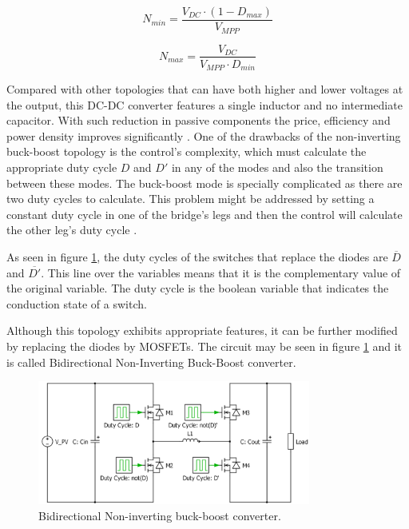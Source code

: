 \begin{equation} \label{boost_number_of_panels}
 N_{min} = \frac{V_{DC} \cdot (1 - D_{max})}{V_{MPP}}
\end{equation}

\begin{equation} \label{buck_number_of_panels}
 N_{max} = \frac{V_{DC}}{V_{MPP} \cdot D_{min}}
\end{equation}

Compared with other topologies that can have both higher and lower voltages at the output, this DC-DC converter features a single inductor and no intermediate capacitor. With such reduction in passive components the price, efficiency and power density improves significantly \cite{underthehood}. One of the drawbacks of the non-inverting buck-boost topology is the control's complexity, which must calculate the appropriate duty cycle $D$ and $D'$ in any of the modes and also the transition between these modes. The buck-boost mode is specially complicated as there are two duty cycles to calculate. This problem might be addressed by setting a constant duty cycle in one of the bridge's legs and then the control will calculate the other leg's duty cycle  \cite{AN4449_ST}.

As seen in figure \ref{BID_N_INV_BB_SCHEMATIC}, the duty cycles of the switches that replace the diodes are $\overline{D}$ and $\overline{D'}$. This line over the variables means that it is the complementary value of the original variable. The duty cycle is the boolean variable that indicates the conduction state of a switch. 
		
Although this topology exhibits appropriate features, it can be further modified by replacing the diodes by MOSFETs. The circuit may be seen in figure \ref{BID_N_INV_BB_SCHEMATIC} and it is called Bidirectional Non-Inverting Buck-Boost converter.

\begin{figure}[H]
	\begin{center}
		\includegraphics[width=0.8\textwidth]{../Pictures/BID_H_B_BB}
		\caption{Bidirectional Non-inverting buck-boost converter.}
		\label{BID_N_INV_BB_SCHEMATIC}
	\end{center}
\end{figure}

